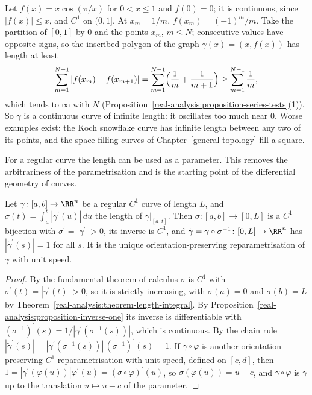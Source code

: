 \begin{counterexample}\label{real-analysis:counterexample-non-rectifiable}
Let $f(x) = x\cos(\pi/x)$ for $0 < x \leq 1$ and $f(0) = 0$; it is continuous, since $|f(x)| \leq x$, and $C^1$ on $(0, 1]$. At $x_m = 1/m$, $f(x_m) = (-1)^m/m$. Take the partition of $[0, 1]$ by $0$ and
the points $x_m$, $m \leq N$; consecutive values have opposite signs, so the inscribed polygon of the graph $\gamma(x) = (x, f(x))$ has length at least
\[
\sum_{m=1}^{N-1}|f(x_m) - f(x_{m+1})| = \sum_{m=1}^{N-1}\Bigl(\frac1m + \frac{1}{m+1}\Bigr) \geq \sum_{m=1}^{N-1}\frac1m,
\]
which tends to $\infty$ with $N$ (Proposition~\ref{real-analysis:proposition-series-tests}(1)). So $\gamma$ is a continuous curve of infinite length: it oscillates too much near $0$. Worse examples exist: the Koch snowflake
curve has infinite length between any two of its points, and the space-filling curves of Chapter~\ref{general-topology} fill a square.
\end{counterexample}

For a regular curve the length can be used as a parameter. This removes the arbitrariness of the parametrisation and is the starting point of the differential geometry of curves.

\begin{proposition}\label{real-analysis:proposition-arc-length}
Let $\gamma \colon [a, b] \to \RR^n$ be a regular $C^1$ curve of length $L$, and $\sigma(t) = \int_a^t|\gamma^{\prime}(u)|\,du$ the length of $\gamma|_{[a, t]}$. Then $\sigma \colon [a, b] \to [0, L]$ is a $C^1$ bijection with
$\sigma^{\prime} = |\gamma^{\prime}| > 0$, its inverse is $C^1$, and $\tilde\gamma = \gamma \circ \sigma^{-1} \colon [0, L] \to \RR^n$ has $|\tilde\gamma^{\prime}(s)| = 1$ for all $s$. It is the unique orientation-preserving
reparametrisation of $\gamma$ with unit speed.
\end{proposition}

\begin{proof}
By the fundamental theorem of calculus $\sigma$ is $C^1$ with $\sigma^{\prime}(t) = |\gamma^{\prime}(t)| > 0$, so it is strictly increasing, with $\sigma(a) = 0$ and $\sigma(b) = L$ by Theorem~\ref{real-analysis:theorem-length-integral}.
By Proposition~\ref{real-analysis:proposition-inverse-one} its inverse is differentiable with $(\sigma^{-1})^{\prime}(s) = 1/|\gamma^{\prime}(\sigma^{-1}(s))|$, which is continuous. By the chain rule
$|\tilde\gamma^{\prime}(s)| = |\gamma^{\prime}(\sigma^{-1}(s))|\,(\sigma^{-1})^{\prime}(s) = 1$. If $\gamma \circ \varphi$ is another orientation-preserving $C^1$ reparametrisation with unit speed, defined on $[c, d]$, then
$1 = |\gamma^{\prime}(\varphi(u))|\varphi^{\prime}(u) = (\sigma \circ \varphi)^{\prime}(u)$, so $\sigma(\varphi(u)) = u - c$, and $\gamma \circ \varphi$ is $\tilde\gamma$ up to the translation $u \mapsto u - c$ of the parameter.
\end{proof}


